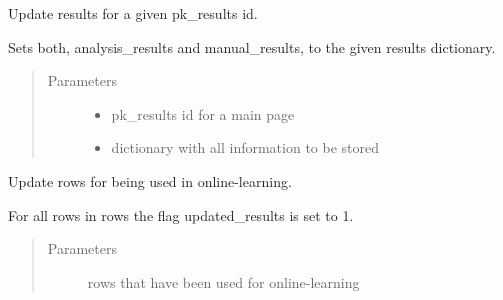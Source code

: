 \documentclass[letterpaper,10pt,english]{sphinxmanual}
\begin{document}
\begin{fulllineitems}

\begin{fulllineitems}
\label{\detokenize{api:db_interface.DBInterface.update_results_with_parent_resources}}
Update results for a given pk\_results id.

Sets both, analysis\_results and manual\_results, to the given
results dictionary.
\begin{quote}\begin{description}
\item[{Parameters}] \leavevmode\begin{itemize}
\item {} 
 \textendash{} pk\_results id for a main page

\item {} 
 \textendash{} dictionary with all information to be stored

\end{itemize}

\end{description}\end{quote}

\end{fulllineitems}


\begin{fulllineitems}
\label{\detokenize{api:db_interface.DBInterface.update_update_flag}}
Update rows for being used in online-learning.

For all rows in rows the flag updated\_results is set to 1.
\begin{quote}\begin{description}
\item[{Parameters}] \leavevmode
{} \textendash{} rows that have been used for online-learning

\end{description}\end{quote}

\end{fulllineitems}


\end{fulllineitems}
\end{document}
